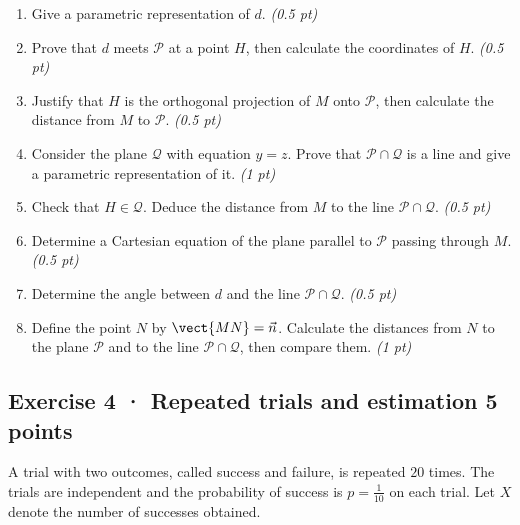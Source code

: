\begin{enumerate}

\item Give a parametric representation of $d$. \hfill\textit{(0.5 pt)}

\item Prove that $d$ meets $\mathcal P$ at a point $H$, then calculate the coordinates of $H$. \hfill\textit{(0.5 pt)}

\item Justify that $H$ is the orthogonal projection of $M$ onto $\mathcal P$, then calculate the distance from $M$ to $\mathcal P$. \hfill\textit{(0.5 pt)}

\item Consider the plane $\mathcal Q$ with equation $y=z$. Prove that $\mathcal P\cap\mathcal Q$ is a line and give a parametric representation of it. \hfill\textit{(1 pt)}

\item Check that $H\in\mathcal Q$. Deduce the distance from $M$ to the line $\mathcal P\cap\mathcal Q$. \hfill\textit{(0.5 pt)}

\item Determine a Cartesian equation of the plane parallel to $\mathcal P$ passing through $M$. \hfill\textit{(0.5 pt)}

\item Determine the angle between $d$ and the line $\mathcal P\cap\mathcal Q$. \hfill\textit{(0.5 pt)}

\item Define the point $N$ by $\vect{MN}=\vec n$. Calculate the distances from $N$ to the plane $\mathcal P$ and to the line $\mathcal P\cap\mathcal Q$, then compare them. \hfill\textit{(1 pt)}

\end{enumerate}

\subsection*{Exercise 4 · Repeated trials and estimation \hfill 5 points}A trial with two outcomes, called success and failure, is repeated $20$ times. The trials are independent and the probability of success is $p=\frac{1}{10}$ on each trial. Let $X$ denote the number of successes obtained.

